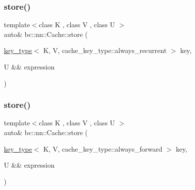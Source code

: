 \mbox{\label{structbc_1_1nn_1_1Cache_a8bab29fabb515c53dd65b1c82f91df96}} 
\subsubsection{\texorpdfstring{store()}{store()}\hspace{0.1cm}{\footnotesize\ttfamily [2/3]}}
{\footnotesize\ttfamily template$<$class K , class V , class U $>$ \\
auto\& bc\+::nn\+::\+Cache\+::store (\begin{DoxyParamCaption}\item[{\hyperlink{structbc_1_1nn_1_1Cache_aedd77c5710dcb5f9edd8ecb3c3041048}{key\+\_\+type}$<$ K, V, cache\+\_\+key\+\_\+type\+::always\+\_\+recurrent $>$}]{key,  }\item[{U \&\&}]{expression }\end{DoxyParamCaption})\hspace{0.3cm}{\ttfamily [inline]}}

\mbox{\label{structbc_1_1nn_1_1Cache_af86f0bbe8821b5671b2ffa34ab9443d9}} 
\subsubsection{\texorpdfstring{store()}{store()}\hspace{0.1cm}{\footnotesize\ttfamily [3/3]}}
{\footnotesize\ttfamily template$<$class K , class V , class U $>$ \\
auto\& bc\+::nn\+::\+Cache\+::store (\begin{DoxyParamCaption}\item[{\hyperlink{structbc_1_1nn_1_1Cache_aedd77c5710dcb5f9edd8ecb3c3041048}{key\+\_\+type}$<$ K, V, cache\+\_\+key\+\_\+type\+::always\+\_\+forward $>$}]{key,  }\item[{U \&\&}]{expression }\end{DoxyParamCaption})\hspace{0.3cm}{\ttfamily [inline]}}

\mbox{\label{structbc_1_1nn_1_1Cache_ad2ffef3741713197af3149c0f4356572}} 
